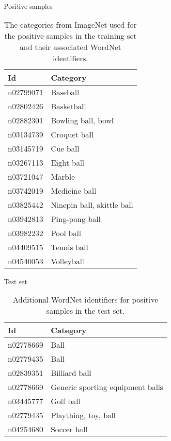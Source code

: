 \documentclass{beamer}
\begin{document}
\begin{frame}{Positive samples}
	\begin{table}[H]
		\footnotesize
		\centering
		\caption{The categories from ImageNet used for the positive samples in the training set and their associated WordNet \citep{fellbaum1998wordnet} identifiers.}
		\label{tab:postraining}
		\begin{tabularx}{\textwidth}{lX}
			\toprule
			\textbf{Id} & \textbf{Category} \\
			\midrule
			n02799071 & Baseball \\
			n02802426 & Basketball \\
			n02882301 & Bowling ball, bowl \\
			n03134739 & Croquet ball \\
			n03145719 & Cue ball \\
			n03267113 & Eight ball \\
			n03721047 & Marble \\
			n03742019 & Medicine ball \\
			n03825442 & Ninepin ball, skittle ball \\
			n03942813 & Ping-pong ball \\
			n03982232 & Pool ball \\
			n04409515 & Tennis ball \\
			n04540053 & Volleyball \\
			\bottomrule
		\end{tabularx}
	\end{table}
\end{frame}

\begin{frame}{Test set}
	\begin{table}[H]
		\centering
		\caption{Additional WordNet identifiers for positive samples in the test set.}
		\label{tab:postest}
		\begin{tabularx}{\textwidth}{lX}
			\toprule
			\textbf{Id} & \textbf{Category} \\
			\midrule
				n02778669 & Ball \\
				n02779435 & Ball \\
				n02839351 & Billiard ball \\
				n02778669 & Generic sporting equipment balls \\
				n03445777 & Golf ball \\
				n02779435 & Plaything, toy, ball \\
				n04254680 & Soccer ball \\
			\bottomrule
		\end{tabularx}
	\end{table}
\end{frame}
\end{document}
